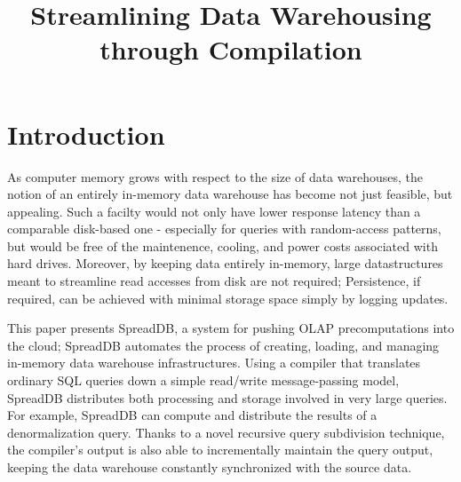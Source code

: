 \documentclass{sig-alternate}
\title{Streamlining Data Warehousing through Compilation}
\author{}%
\begin{document}
\maketitle

\section{Introduction}

As computer memory grows with respect to the size of data warehouses, the notion of an entirely in-memory data warehouse has become not just feasible, but appealing.  Such a facilty would not only have lower response latency than a comparable disk-based one - especially for queries with random-access patterns, but would be free of the maintenence\cite{}, cooling\cite{}, and power\cite{1154557} costs associated with hard drives.  Moreover, by keeping data entirely in-memory, large datastructures meant to streamline read accesses from disk are not required; Persistence, if required, can be achieved with minimal storage space simply by logging updates.

This paper presents SpreadDB, a system for pushing OLAP precomputations into the cloud; SpreadDB automates the process of creating, loading, and managing in-memory data warehouse infrastructures.  Using a compiler that translates ordinary SQL queries down a simple read/write message-passing model, SpreadDB distributes both processing and storage involved in very large queries.  For example, SpreadDB can compute and distribute the results of a denormalization query.  Thanks to a novel recursive query subdivision technique, the compiler's output is also able to incrementally maintain the query output, keeping the data warehouse constantly synchronized with the source data.
\end{document}
